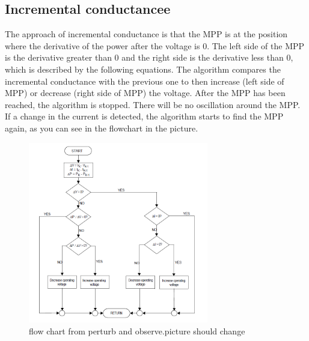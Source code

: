 \subsection{Incremental conductancee}
The approach of incremental conductance is that the MPP is at the position where the derivative of the power after the voltage is 0. The left side of the MPP is the derivative greater than 0 and the right side is the derivative less than 0, which is described by the following equations. The algorithm compares the incremental conductance with the previous one to then increase (left side of MPP) or decrease (right side of MPP) the voltage.  After the MPP has been reached, the algorithm is stopped. There will be no oscillation around the MPP. If a change in the current is detected, the algorithm starts to find the MPP again, as you can see in the flowchart in the picture.

\begin{figure}[H]
	\begin{center}
		\includegraphics[width=0.7\textwidth]{../Pictures/P1/Flow_chart/flow_chart_incremental_conductance}
		\caption{flow chart from perturb and observe.picture should change }
		\label{fcinccon}
	\end{center}	
\end{figure}